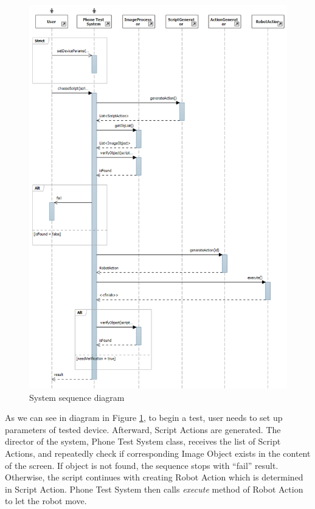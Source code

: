     \begin{figure}[H]
		\centering
		\includegraphics[scale=0.75]{Chapters/Fig/sequence_diagram.png}
		\caption{System sequence diagram}
		\label{fig:sequence_diagram}
	\end{figure}

As we can see in diagram in Figure \ref{fig:sequence_diagram}, to begin a test, user needs to set up parameters of tested device. Afterward, Script Actions are generated. The director of the system, Phone Test System class, receives the list of Script Actions, and repeatedly check if corresponding Image Object exists in the content of the screen. If object is not found, the sequence stops with ``fail'' result. Otherwise, the script continues with creating Robot Action which is determined in Script Action. Phone Test System then calls \textit{execute} method of Robot Action to let the robot move.

